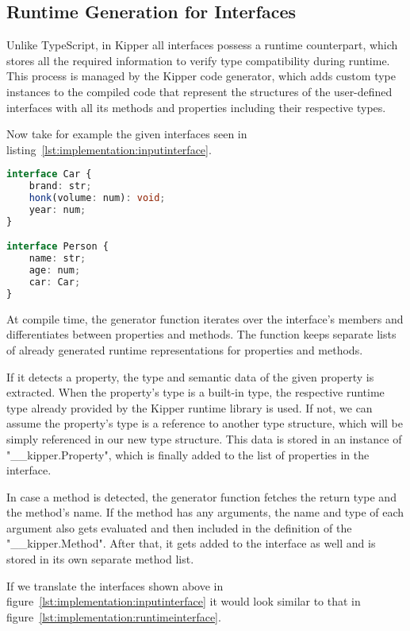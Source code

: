 \subsection{Runtime Generation for Interfaces}

Unlike TypeScript, in Kipper all interfaces possess a runtime counterpart, which stores all the required information to verify type compatibility during runtime. This process is managed by the Kipper code generator, which adds custom type instances to the compiled code that represent the structures of the user-defined interfaces with all its methods and properties including their respective types.

Now take for example the given interfaces seen in listing~\ref{lst:implementation:inputinterface}.

\begin{lstlisting}[language=Typescript,caption=Example interfaces in the Kipper language,label=lst:implementation:inputinterface]
interface Car {
	brand: str;
	honk(volume: num): void;
	year: num;
}

interface Person {
	name: str;
	age: num;
	car: Car;
}
\end{lstlisting}

 At compile time, the generator function iterates over the interface's members and differentiates between properties and methods. The function keeps separate lists of already generated runtime representations for properties and methods.
 
 If it detects a property, the type and semantic data of the given property is extracted. When the property's type is a built-in type, the respective runtime type already provided by the Kipper runtime library is used. If not, we can assume the property's type is a reference to another type structure, which will be simply referenced in our new type structure. This data is stored in an instance of "\_\_kipper.Property", which is finally added to the list of properties in the interface.
 
 In case a method is detected, the generator function fetches the return type and the method's name. If the method has any arguments, the name and type of each argument also gets evaluated and then included in the definition of the "\_\_kipper.Method". After that, it gets added to the interface as well and is stored in its own separate method list.
 
 If we translate the interfaces shown above in figure~\ref{lst:implementation:inputinterface} it would look similar to that in figure~\ref{lst:implementation:runtimeinterface}.

